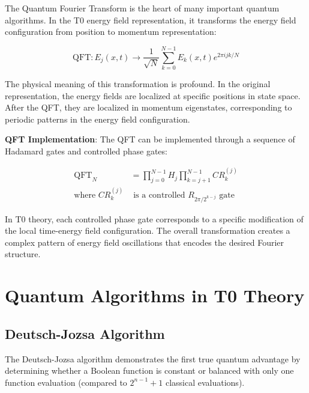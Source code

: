 \documentclass[12pt,a4paper]{article}
\theoremstyle{definition}
\theoremstyle{remark}
\begin{document}
	The Quantum Fourier Transform is the heart of many important quantum algorithms. In the T0 energy field representation, it transforms the energy field configuration from position to momentum representation:
	
	\begin{equation}
		\text{QFT}: E_j(x,t) \rightarrow \frac{1}{\sqrt{N}} \sum_{k=0}^{N-1} E_k(x,t) e^{2\pi i jk/N}
		\label{eq:qft_detailed}
	\end{equation}
	
	The physical meaning of this transformation is profound. In the original representation, the energy fields are localized at specific positions in state space. After the QFT, they are localized in momentum eigenstates, corresponding to periodic patterns in the energy field configuration.
	
	\textbf{QFT Implementation}:
	The QFT can be implemented through a sequence of Hadamard gates and controlled phase gates:
	
	\begin{align}
		\text{QFT}_N &= \prod_{j=0}^{N-1} H_j \prod_{k=j+1}^{N-1} CR_k^{(j)} \\
		\text{where } CR_k^{(j)} &\text{ is a controlled } R_{2\pi/2^{k-j}} \text{ gate}
	\end{align}
	
	In T0 theory, each controlled phase gate corresponds to a specific modification of the local time-energy field configuration. The overall transformation creates a complex pattern of energy field oscillations that encodes the desired Fourier structure.
	
	\section{Quantum Algorithms in T0 Theory}
	
	\subsection{Deutsch-Jozsa Algorithm}
	
	The Deutsch-Jozsa algorithm demonstrates the first true quantum advantage by determining whether a Boolean function is constant or balanced with only one function evaluation (compared to $2^{n-1}+1$ classical evaluations).
	
\end{document}

